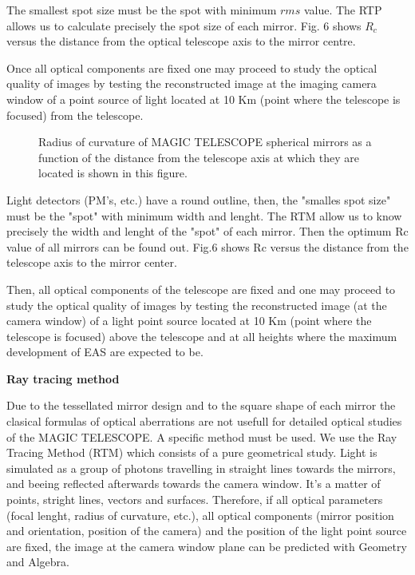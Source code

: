 {The smallest spot size must be the spot with minimum $rms$ value. The RTP allows us to calculate precisely the spot size of each mirror. Fig. 6 shows $R_c$ versus the distance from the optical telescope axis to the mirror centre.

Once all optical components are fixed one may proceed to study the optical quality of images by testing the reconstructed image at the imaging camera window of a point source of light located at 10 Km (point where the telescope is focused) from the telescope.




   \begin{figure}[h]\centering
   \leavevmode
   \epsfxsize=6cm
   \caption{\tiny{Radius of curvature of MAGIC TELESCOPE spherical mirrors as a function of the distance from the telescope axis at which they are located is shown in this figure.}}
   \end{figure}
\vspace{0.2cm}


Light detectors (PM's, etc.) have a round outline, then, the "smalles spot size" must be the "spot" with minimum width and lenght. The RTM allow us to know precisely the width and lenght of the "spot" of each mirror. Then the optimum Rc value of all mirrors can be found out.
Fig.6 shows Rc versus the distance from the telescope axis to the mirror center.


Then, all optical components of the telescope are fixed and one may proceed to study the optical quality of images by testing 
the reconstructed image (at the camera window) of a light point source located at 10 Km (point where the telescope is focused) above the telescope and at all heights where the maximum development of EAS are expected to be. 

\vspace{0.5cm}

{\bf Ray tracing method}

Due to the tessellated mirror design and to the square shape of each mirror the clasical formulas of optical aberrations are not usefull for detailed optical studies of the MAGIC TELESCOPE. 
A specific method must be used. We use the Ray Tracing Method (RTM) which consists of a pure geometrical study. Light is simulated
as a group of photons travelling in straight lines towards the mirrors, and beeing reflected afterwards towards the camera window. It's a matter of points, stright lines, vectors and surfaces. Therefore, if all optical parameters (focal lenght, radius of curvature, etc.), all optical components (mirror position and orientation, position of the camera) and the position of the light point source are fixed, the image at the camera window plane can be predicted with Geometry and Algebra.

}
